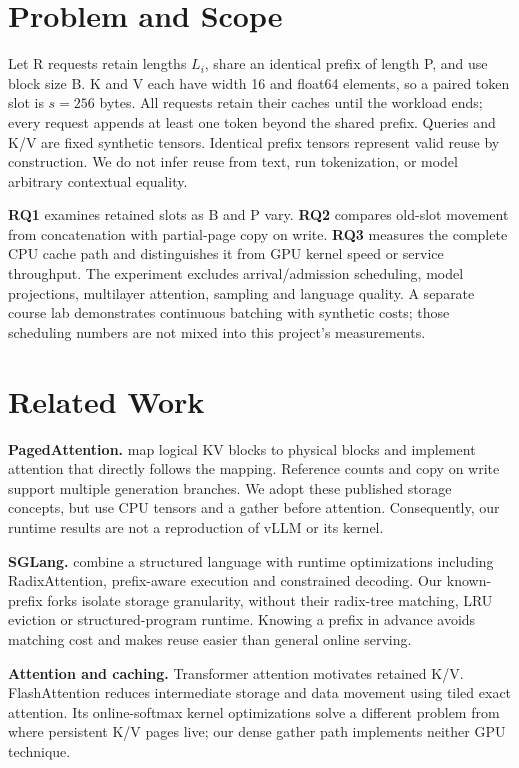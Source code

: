 \documentclass{article}
\begin{document}
\section{Problem and Scope}
Let R requests retain lengths $L_i$, share an identical prefix of length P, and use block size B. K and V each have width 16 and float64 elements, so a paired token slot is $s=256$ bytes. All requests retain their caches until the workload ends; every request appends at least one token beyond the shared prefix. Queries and K/V are fixed synthetic tensors. Identical prefix tensors represent valid reuse by construction. We do not infer reuse from text, run tokenization, or model arbitrary contextual equality.

\textbf{RQ1} examines retained slots as B and P vary. \textbf{RQ2} compares old-slot movement from concatenation with partial-page copy on write. \textbf{RQ3} measures the complete CPU cache path and distinguishes it from GPU kernel speed or service throughput. The experiment excludes arrival/admission scheduling, model projections, multilayer attention, sampling and language quality. A separate course lab demonstrates continuous batching with synthetic costs; those scheduling numbers are not mixed into this project's measurements.

\section{Related Work}
\textbf{PagedAttention.} \citet{kwon2023} map logical KV blocks to physical blocks and implement attention that directly follows the mapping. Reference counts and copy on write support multiple generation branches. We adopt these published storage concepts, but use CPU tensors and a gather before attention. Consequently, our runtime results are not a reproduction of vLLM or its kernel.

\textbf{SGLang.} \citet{zheng2024} combine a structured language with runtime optimizations including RadixAttention, prefix-aware execution and constrained decoding. Our known-prefix forks isolate storage granularity, without their radix-tree matching, LRU eviction or structured-program runtime. Knowing a prefix in advance avoids matching cost and makes reuse easier than general online serving.

\textbf{Attention and caching.} Transformer attention \citep{vaswani2017} motivates retained K/V. FlashAttention \citep{dao2022} reduces intermediate storage and data movement using tiled exact attention. Its online-softmax kernel optimizations solve a different problem from where persistent K/V pages live; our dense gather path implements neither GPU technique.
\end{document}
